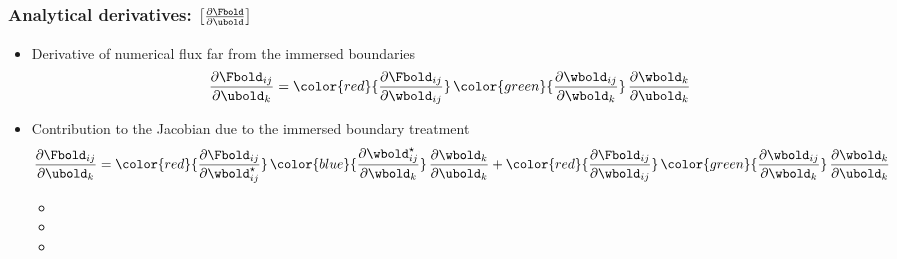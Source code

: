 
\begin{frame}
  \frametitle{Analytical derivatives: $\left[\frac{\partial \Fbold}{\partial \ubold}\right]$}
  \begin{itemize}
  \item Derivative of numerical flux far from the immersed boundaries
  \begin{equation*}
    \frac{\partial \Fbold_{ij}}{\partial \ubold_{k}} = 
    {\color{red}{\frac{\partial \Fbold_{ij}}{\partial \wbold_{ij}}}} \,
    {\color{green}{\frac{\partial \wbold_{ij}}{\partial \wbold_k}}}\,
    \frac{\partial \wbold_k}{\partial \ubold_k}
  \end{equation*}
\item Contribution to the Jacobian due to the immersed boundary treatment
    \begin{equation*}
    \frac{\partial \Fbold_{ij}}{\partial \ubold_k} = 
    {\color{red}{\frac{\partial \Fbold_{ij}}{\partial \wbold_{ij}^\star}}} \,
    {\color{blue}{\frac{\partial \wbold_{ij}^\star}{\partial \wbold_k}}} \,
    \frac{\partial \wbold_k}{\partial \ubold_k} +
    {\color{red}{\frac{\partial \Fbold_{ij}}{\partial \wbold_{ij}}}} \,
    {\color{green}{\frac{\partial \wbold_{ij}}{\partial \wbold_k}}} \,
    \frac{\partial \wbold_k}{\partial \ubold_k}
    \end{equation*}
  \begin{itemize}
  \item {\color{red}{Analytical Jacobian of the (Roe's) numerical flux}}
  \item {\color{blue}{Analytical derivative of the solution of the 1D half-Riemann problem}}
  \item {\color{green}{Analytical derivative of MUSCL reconstruction and limitation}}  
  \end{itemize}
 \end{itemize}
\end{frame}



